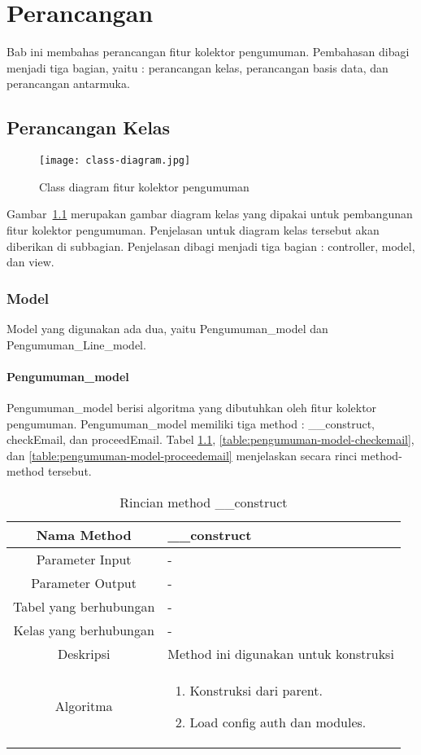 \chapter{Perancangan}
\label{chap:perancangan}

Bab ini membahas perancangan fitur kolektor pengumuman. Pembahasan dibagi menjadi tiga bagian, yaitu : perancangan kelas, perancangan basis data, dan perancangan antarmuka.
 
\section{Perancangan Kelas}
\begin{figure}[H]
	\centering  
	\texttt{[image: class-diagram.jpg]}  
	\caption[Class diagram fitur kolektor pengumuman]{Class diagram fitur kolektor pengumuman} 
	\label{fig:class-diagram} 
\end{figure}
Gambar~\ref{fig:class-diagram} merupakan gambar diagram kelas yang dipakai untuk pembangunan fitur kolektor pengumuman. Penjelasan untuk diagram kelas tersebut akan diberikan di subbagian. Penjelasan dibagi menjadi tiga bagian : controller, model, dan view.

\subsection{Model}
Model yang digunakan ada dua, yaitu Pengumuman\_model dan Pengumuman\_Line\_model.
\subsubsection{Pengumuman\_model}
Pengumuman\_model berisi algoritma yang dibutuhkan oleh fitur kolektor pengumuman. Pengumuman\_model memiliki tiga method : \_\_construct, checkEmail, dan proceedEmail. Tabel \ref{table:pengumuman-model-construct}, \ref{table:pengumuman-model-checkemail}, dan \ref{table:pengumuman-model-proceedemail} menjelaskan secara rinci method-method tersebut.

\begin{center}
	\begin{table}[H]
	\caption{Rincian method \_\_construct}
	\label{table:pengumuman-model-construct}
\begin{tabular}{|c|p{11cm}|}
\hline
Nama Method 	& 	 	\_\_construct \\
\hline
Parameter Input & - \\
\hline
Parameter Output & - \\
\hline
Tabel yang berhubungan & -\\
\hline
Kelas yang berhubungan &  - \\
\hline
Deskripsi	& Method ini digunakan untuk konstruksi\\
\hline
Algoritma	& \begin{enumerate}
				\item Konstruksi dari parent.
				\item Load config auth dan modules.
				\end{enumerate} \\
\hline
\end{tabular}
\end{table}
\end{center}

